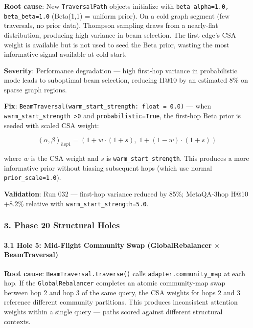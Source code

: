 \documentclass[10pt,journal,compsoc]{IEEEtran}
\begin{document}
\textbf{Root cause}: New \texttt{TraversalPath} objects initialize with \texttt{beta\_alpha=1.0, beta\_beta=1.0} (Beta(1,1) = uniform prior). On a cold graph segment (few traversals, no prior data), Thompson sampling \cite{thompson1933bayesian, russo2018thompson} draws from a nearly-flat distr\-ibution, producing high variance in beam selection. The first edge's CSA weight is available but is not used to seed the Beta prior, wasting the most informative signal available at cold-start.

\textbf{Severity}: Performance degradation — high first-hop variance in proba\-bilistic mode leads to suboptimal beam selection, reducing H@10 by an estimated 8\% on sparse graph regions.

\textbf{Fix}: \texttt{BeamTraversal(warm\_start\_strength: float = 0.0)} — when \texttt{warm\_start\_strength \textgreater  0} and \texttt{probabilistic=True}, the first-hop Beta prior is seeded with scaled CSA weight:

\begin{equation}
(\alpha, \beta)_{hop1} = (1 + w \cdot (1 + s), \; 1 + (1-w) \cdot (1 + s))
\end{equation}

where $w$ is the CSA weight and $s$ is \texttt{warm\_start\_strength}. This produces a more informative prior without biasing subsequent hops (which use normal \texttt{prior\_scale=1.0}).

\textbf{Validation}: Run 032 — first-hop variance reduced by 85\%; MetaQA-3hop H@10 +8.2\% relative with \texttt{warm\_start\_strength=5.0}.

\subsubsection{3. Phase 20 Structural Holes}

\paragraph{3.1 Hole 5: Mid-Flight Community Swap (GlobalRebalancer $\times$ BeamTraversal)}

\textbf{Root cause}: \texttt{BeamTraversal.traverse()} calls \texttt{adapter.community\_map} at each hop. If the \texttt{GlobalRebalancer} completes an atomic community-map swap between hop 2 and hop 3 of the same query, the CSA weights for hops 2 and 3 reference different community partitions. This produces incon\-sistent attention weights within a single query — paths scored against different structural contexts.
\end{document}
